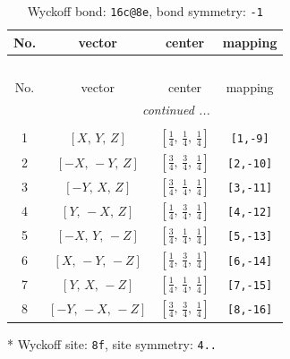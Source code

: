 \documentclass[fleqn,8pt]{jsarticle}
\begin{document}
\renewcommand{\arraystretch}{1.2}
\begin{longtable}{cccc}
\caption{Wyckoff bond: {\tt 16c@8e}, bond symmetry: {\tt -1}}
 \\
 \hline \hline
No. & vector & center & mapping \\ \hline \endfirsthead

\multicolumn{3}{l}{\tablename\ \thetable{}} \\
 \hline \hline
No. & vector & center & mapping \\ \hline \endhead

 \hline \hline
\multicolumn{3}{r}{\footnotesize\it continued ...} \\ \endfoot

 \hline \hline
\multicolumn{3}{r}{} \\ \endlastfoot

1 & $\left[ X,\, Y,\, Z \right]$ & $\left[ \frac{1}{4},\, \frac{1}{4},\, \frac{1}{4} \right]$ & {\tt [1,-9]} \\ \hline
2 & $\left[ - X,\, - Y,\, Z \right]$ & $\left[ \frac{3}{4},\, \frac{3}{4},\, \frac{1}{4} \right]$ & {\tt [2,-10]} \\ \hline
3 & $\left[ - Y,\, X,\, Z \right]$ & $\left[ \frac{3}{4},\, \frac{1}{4},\, \frac{1}{4} \right]$ & {\tt [3,-11]} \\ \hline
4 & $\left[ Y,\, - X,\, Z \right]$ & $\left[ \frac{1}{4},\, \frac{3}{4},\, \frac{1}{4} \right]$ & {\tt [4,-12]} \\ \hline
5 & $\left[ - X,\, Y,\, - Z \right]$ & $\left[ \frac{3}{4},\, \frac{1}{4},\, \frac{1}{4} \right]$ & {\tt [5,-13]} \\ \hline
6 & $\left[ X,\, - Y,\, - Z \right]$ & $\left[ \frac{1}{4},\, \frac{3}{4},\, \frac{1}{4} \right]$ & {\tt [6,-14]} \\ \hline
7 & $\left[ Y,\, X,\, - Z \right]$ & $\left[ \frac{1}{4},\, \frac{1}{4},\, \frac{1}{4} \right]$ & {\tt [7,-15]} \\ \hline
8 & $\left[ - Y,\, - X,\, - Z \right]$ & $\left[ \frac{3}{4},\, \frac{3}{4},\, \frac{1}{4} \right]$ & {\tt [8,-16]} \\
\end{longtable}
* Wyckoff site: {\tt 8f}, site symmetry: {\tt 4..}
\renewcommand{\arraystretch}{1.2}
\end{document}
